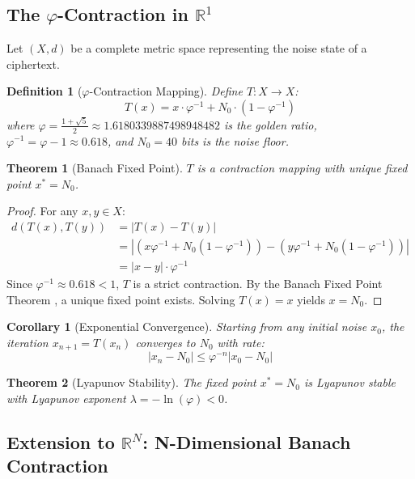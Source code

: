\documentclass{article}
\newtheorem{theorem}{Theorem}[section]
\newtheorem{corollary}{Corollary}[theorem]
\newtheorem{definition}{Definition}[section]
\begin{document}
\subsection{The $\varphi$-Contraction in $\mathbb{R}^1$}

Let $(X, d)$ be a complete metric space representing the noise state of a ciphertext.

\begin{definition}[$\varphi$-Contraction Mapping]
Define $T: X \to X$:
\begin{equation}
T(x) = x \cdot \varphi^{-1} + N_0 \cdot (1 - \varphi^{-1})
\end{equation}
where $\varphi = \frac{1+\sqrt{5}}{2} \approx 1.6180339887498948482$ is the golden ratio, $\varphi^{-1} = \varphi - 1 \approx 0.618$, and $N_0 = 40$ bits is the noise floor.
\end{definition}

\begin{theorem}[Banach Fixed Point]
$T$ is a contraction mapping with unique fixed point $x^* = N_0$.
\end{theorem}

\begin{proof}
For any $x, y \in X$:
\begin{align}
d(T(x), T(y)) &= |T(x) - T(y)| \\
&= |(x\varphi^{-1} + N_0(1 - \varphi^{-1})) - (y\varphi^{-1} + N_0(1 - \varphi^{-1}))| \\
&= |x - y| \cdot \varphi^{-1}
\end{align}
Since $\varphi^{-1} \approx 0.618 < 1$, $T$ is a strict contraction. By the Banach Fixed Point Theorem \cite{banach1922}, a unique fixed point exists. Solving $T(x) = x$ yields $x = N_0$.
\end{proof}

\begin{corollary}[Exponential Convergence]
Starting from any initial noise $x_0$, the iteration $x_{n+1} = T(x_n)$ converges to $N_0$ with rate:
\begin{equation}
|x_n - N_0| \leq \varphi^{-n} |x_0 - N_0|
\end{equation}
\end{corollary}

\begin{theorem}[Lyapunov Stability]
The fixed point $x^* = N_0$ is Lyapunov stable with Lyapunov exponent $\lambda = -\ln(\varphi) < 0$.
\end{theorem}

\subsection{Extension to $\mathbb{R}^N$: N-Dimensional Banach Contraction}
\end{document}
